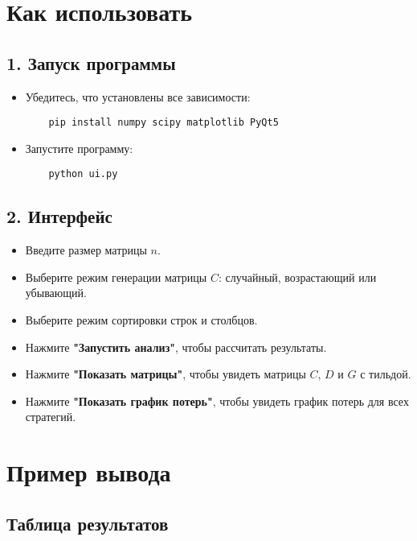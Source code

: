 \documentclass{article}
\begin{document}
\section*{Как использовать}

\subsection*{1. Запуск программы}
\begin{itemize}
    \item Убедитесь, что установлены все зависимости:
    \begin{verbatim}
    pip install numpy scipy matplotlib PyQt5
    \end{verbatim}
    \item Запустите программу:
    \begin{verbatim}
    python ui.py
    \end{verbatim}
\end{itemize}

\subsection*{2. Интерфейс}
\begin{itemize}
    \item Введите размер матрицы \( n \).
    \item Выберите режим генерации матрицы \( C \): случайный, возрастающий или убывающий.
    \item Выберите режим сортировки строк и столбцов.
    \item Нажмите \textbf{"Запустить анализ"}, чтобы рассчитать результаты.
    \item Нажмите \textbf{"Показать матрицы"}, чтобы увидеть матрицы \( C \), \( D \) и \( G \) с тильдой.
    \item Нажмите \textbf{"Показать график потерь"}, чтобы увидеть график потерь для всех стратегий.
\end{itemize}

\section*{Пример вывода}

\subsection*{Таблица результатов}
\end{document}
